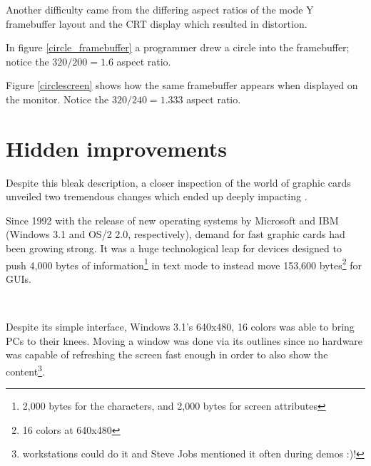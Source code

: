  \label{vga_ratio}
\par
\vspace{-10pt}
Another difficulty came from the differing aspect ratios of the mode Y framebuffer layout and the CRT display which resulted in distortion. \\
\par
\vspace{-10pt}
\par
In figure \ref{circle_framebuffer} a programmer drew a circle into the framebuffer; notice the $ 320/200 = 1.6 $ aspect ratio.\\
\par
{}
\par
Figure \ref{circlescreen} shows how the same framebuffer appears when displayed on the monitor. Notice the $ 320/240 = 1.333 $ aspect ratio.\\







\section{Hidden improvements}
Despite this bleak description, a closer inspection of the world of graphic cards unveiled two tremendous changes which ended up deeply impacting \doom. \\
\par
Since 1992 with the release of new operating systems by Microsoft and IBM (Windows 3.1 and OS/2 2.0, respectively), demand for fast graphic cards had been growing strong. It was a huge technological leap for devices designed to push 4,000 bytes of information\footnote{2,000 bytes for the characters, and 2,000 bytes for screen attributes} in text mode to instead move 153,600 bytes\footnote{16 colors at 640x480} for GUIs.

\\
\par 
Despite its simple interface, Windows 3.1's 640x480, 16 colors was able to bring PCs to their knees. Moving a window was done via its outlines since no hardware was capable of refreshing the screen fast enough in order to also show the content\footnote{\NeXT workstations could do it and Steve Jobs mentioned it often during demos :)!}.



